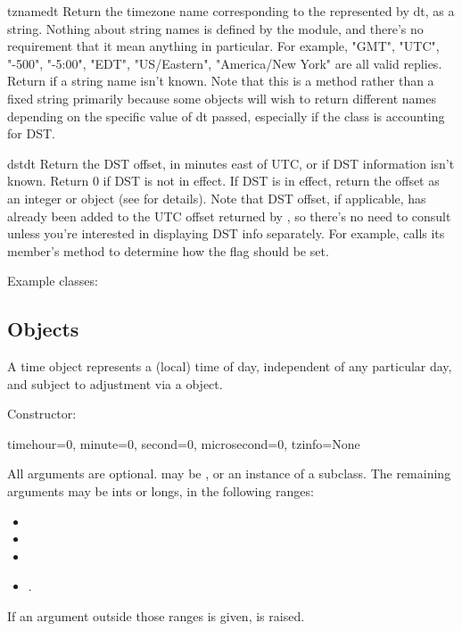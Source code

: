 \begin{methoddesc}{tzname}{dt}
    Return the timezone name corresponding to the  represented
    by dt, as a string.  Nothing about string names is defined by the
     module, and there's no requirement that it mean anything
    in particular.  For example, "GMT", "UTC", "-500", "-5:00", "EDT",
    "US/Eastern", "America/New York" are all valid replies.  Return
     if a string name isn't known.  Note that this is a method
    rather than a fixed string primarily because some  objects
    will wish to return different names depending on the specific value
    of dt passed, especially if the  class is accounting for DST.
\end{methoddesc}

\begin{methoddesc}{dst}{dt}
    Return the DST offset, in minutes east of UTC, or  if
    DST information isn't known.  Return 0 if DST is not in effect.
    If DST is in effect, return the offset as an integer or
     object (see  for details).
    Note that DST offset, if applicable, has
    already been added to the UTC offset returned by
    , so there's no need to consult 
    unless you're interested in displaying DST info separately.  For
    example,  calls its 
    member's  method to determine how the
     flag should be set.
\end{methoddesc}

Example  classes:




\subsection{ Objects \label{datetime-timetz}}

A time object represents a (local) time of day, independent of any
particular day, and subject to adjustment via a  object.

Constructor:

\begin{funcdesc}{time}{hour=0, minute=0, second=0, microsecond=0, tzinfo=None}

    All arguments are optional.   may be , or
    an instance of a  subclass.  The remaining arguments
    may be ints or longs, in the following ranges:

\begin{itemize}
  \item {}
  \item {}
  \item {}
  \item {}.
\end{itemize}

    If an argument outside those ranges is given,
     is raised.
\end{funcdesc}


